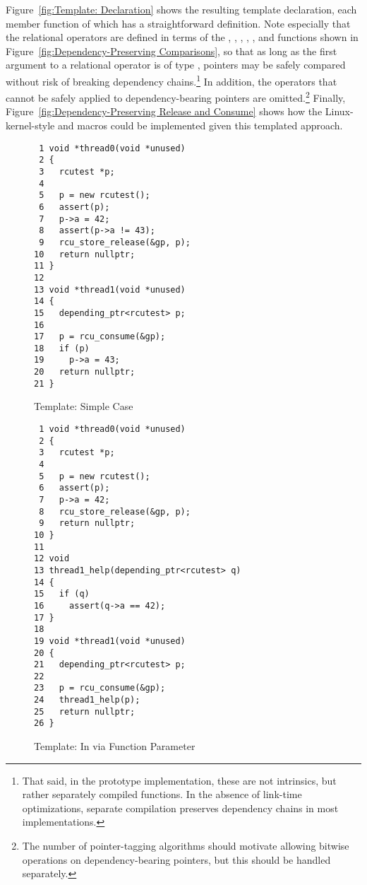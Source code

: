 Figure~\ref{fig:Template: Declaration}
shows the resulting template declaration, each member function of which
has a straightforward definition.
Note especially that the relational operators are defined in terms of the
,
,
,
,
, and
functions shown in
Figure~\ref{fig:Dependency-Preserving Comparisons},
so that as long as the first argument to a relational operator is of type
,
pointers may be safely compared without risk of breaking dependency
chains.\footnote{
	That said, in the prototype implementation,
	these are not intrinsics, but rather separately compiled functions.
	In the absence of link-time optimizations, separate compilation
	preserves dependency chains in most implementations.}
In addition, the operators that cannot be safely applied to
dependency-bearing pointers are omitted.\footnote{
	The number of pointer-tagging algorithms should motivate
	allowing bitwise operations on dependency-bearing
	pointers, but this should be handled separately.}
Finally, Figure~\ref{fig:Dependency-Preserving Release and Consume}
shows how the Linux-kernel-style  and
 macros could be implemented given this
templated approach.

\begin{figure}[tbp]
{ \scriptsize
\begin{verbatim}
 1 void *thread0(void *unused)
 2 {
 3   rcutest *p;
 4
 5   p = new rcutest();
 6   assert(p);
 7   p->a = 42;
 8   assert(p->a != 43);
 9   rcu_store_release(&gp, p);
10   return nullptr;
11 }
12
13 void *thread1(void *unused)
14 {
15   depending_ptr<rcutest> p;
16
17   p = rcu_consume(&gp);
18   if (p)
19     p->a = 43;
20   return nullptr;
21 }
\end{verbatim}
}
\caption{Template: Simple Case}
\label{fig:Template: Simple Case}
\end{figure}

\begin{figure}[tbp]
{ \scriptsize
\begin{verbatim}
 1 void *thread0(void *unused)
 2 {
 3   rcutest *p;
 4
 5   p = new rcutest();
 6   assert(p);
 7   p->a = 42;
 8   rcu_store_release(&gp, p);
 9   return nullptr;
10 }
11
12 void
13 thread1_help(depending_ptr<rcutest> q)
14 {
15   if (q)
16     assert(q->a == 42);
17 }
18
19 void *thread1(void *unused)
20 {
21   depending_ptr<rcutest> p;
22
23   p = rcu_consume(&gp);
24   thread1_help(p);
25   return nullptr;
26 }
\end{verbatim}
}
\caption{Template: In via Function Parameter}
\label{fig:Template: In via Function Parameter}
\end{figure}

